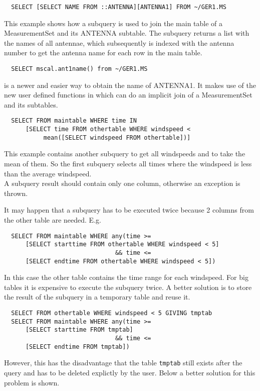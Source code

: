 \begin{verbatim}
  SELECT [SELECT NAME FROM ::ANTENNA][ANTENNA1] FROM ~/GER1.MS 
\end{verbatim}
This example shows how a subquery is used to join the main table of a
MeasurementSet and its ANTENNA subtable. The subquery returns a list
with the names of all antennae, which subsequently is indexed with the
antenna number to get the antenna name for each row in the main table.

\begin{verbatim}
  SELECT mscal.ant1name() from ~/GER1.MS
\end{verbatim}
is a newer and easier way to obtain the name of ANTENNA1. It makes use
of the new user defined functions in
 which can do an implicit join of a MeasurementSet and its subtables.

\begin{verbatim}
  SELECT FROM maintable WHERE time IN
      [SELECT time FROM othertable WHERE windspeed <
           mean([SELECT windspeed FROM othertable])]
\end{verbatim}
This example contains another subquery to get all windspeeds and
to take the mean of them. So the first subquery selects all times
where the windspeed is less than the average windspeed.
\\A subquery result should contain only one column, otherwise
an exception is thrown.

It may happen that a subquery has to be executed twice because
2 columns from the other table are needed. E.g.
\begin{verbatim}
  SELECT FROM maintable WHERE any(time >=
      [SELECT starttime FROM othertable WHERE windspeed < 5]
                               && time <=
      [SELECT endtime FROM othertable WHERE windspeed < 5])
\end{verbatim}
In this case the other table contains the time range for each windspeed.
For big tables it is expensive to execute the subquery twice.
A better solution
is to store the result of the subquery in a temporary table and reuse it.
\begin{verbatim}
  SELECT FROM othertable WHERE windspeed < 5 GIVING tmptab
  SELECT FROM maintable WHERE any(time >=
      [SELECT starttime FROM tmptab]
                               && time <=
      [SELECT endtime FROM tmptab])
\end{verbatim}
However, this has the disadvantage that the table \texttt{tmptab}
still exists after the query and has to be deleted explictly by the
user. Below a better solution for this problem is shown.

